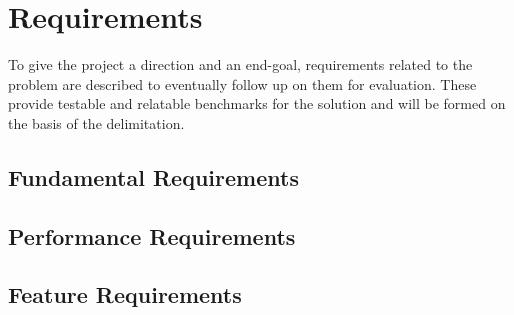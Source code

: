 \chapter{Requirements}\label{Chapter:Requirements}
To give the project a direction and an end-goal, requirements related to the problem are described to eventually follow up on them for evaluation. These provide testable and relatable benchmarks for the solution and will be formed on the basis of the delimitation. 



\section{Fundamental Requirements}

\section{Performance Requirements}

\section{Feature Requirements}






